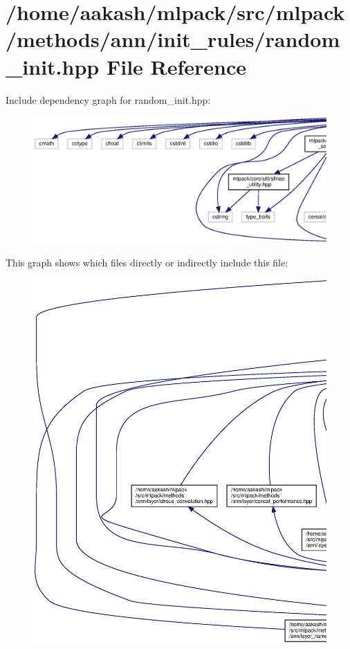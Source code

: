 \section{/home/aakash/mlpack/src/mlpack/methods/ann/init\+\_\+rules/random\+\_\+init.hpp File Reference}
\label{ann_2init__rules_2random__init_8hpp}
Include dependency graph for random\+\_\+init.\+hpp\+:
\nopagebreak
\begin{figure}[H]
\begin{center}
\leavevmode
\includegraphics[width=350pt]{ann_2init__rules_2random__init_8hpp__incl}
\end{center}
\end{figure}
This graph shows which files directly or indirectly include this file\+:
\nopagebreak
\begin{figure}[H]
\begin{center}
\leavevmode
\includegraphics[width=350pt]{ann_2init__rules_2random__init_8hpp__dep__incl}
\end{center}
\end{figure}
